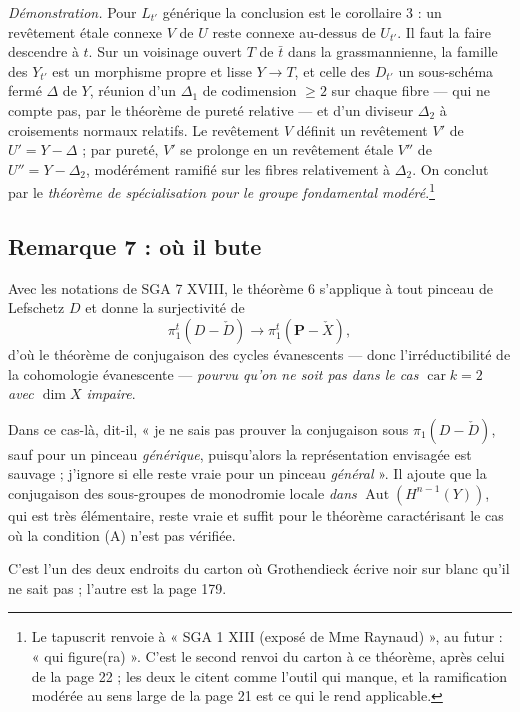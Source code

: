 \documentclass[11pt,a4paper]{article}
\begin{document}
\emph{Démonstration.} Pour $L_{t'}$ générique la conclusion est le corollaire
3 : un revêtement étale connexe $V$ de $U$ reste connexe au-dessus de
$U_{t'}$. Il faut la faire descendre à $t$. Sur un voisinage ouvert $T$ de
$\bar{t}$ dans la grassmannienne, la famille des $Y_{t'}$ est un morphisme
propre et lisse $Y \to T$, et celle des $D_{t'}$ un sous-schéma fermé $\Delta$
de $Y$, réunion d'un $\Delta_{1}$ de codimension $\geqslant 2$ sur chaque
fibre --- qui ne compte pas, par le théorème de pureté relative --- et d'un
diviseur $\Delta_{2}$ à croisements normaux relatifs. Le revêtement $V$
définit un revêtement $V'$ de $U' = Y - \Delta$ ; par pureté, $V'$ se prolonge
en un revêtement étale $V''$ de $U'' = Y - \Delta_{2}$, modérément ramifié sur
les fibres relativement à $\Delta_{2}$. On conclut par le \emph{théorème de
spécialisation pour le groupe fondamental modéré}.\footnote{Le tapuscrit
renvoie à « SGA 1 XIII (exposé de Mme Raynaud) », au futur : « qui
figure(ra) ». C'est le second renvoi du carton à ce théorème, après celui de la
page 22 ; les deux le citent comme l'outil qui manque, et la ramification
modérée au sens large de la page 21 est ce qui le rend applicable.}

\subsection*{Remarque 7 : où il bute}

Avec les notations de SGA 7 XVIII, le théorème 6 s'applique à tout pinceau de
Lefschetz $D$ et donne la surjectivité de
\[
  \pi^{t}_{1}(D - \check{D}) \longrightarrow
  \pi^{t}_{1}(\mathbf{P} - \check{X}) ,
\]
d'où le théorème de conjugaison des cycles évanescents --- donc
l'irréductibilité de la cohomologie évanescente --- \emph{pourvu qu'on ne soit
pas dans le cas $\operatorname{car} k = 2$ avec $\dim X$ impaire}.

Dans ce cas-là, dit-il, « je ne sais pas prouver la conjugaison sous
$\pi_{1}(D - \check{D})$, sauf pour un pinceau \emph{générique}, puisqu'alors
la représentation envisagée est sauvage ; j'ignore si elle reste vraie pour un
pinceau \emph{général} ». Il ajoute que la conjugaison des sous-groupes de
monodromie locale \emph{dans} $\operatorname{Aut}(H^{n-1}(Y))$, qui est très
élémentaire, reste vraie et suffit pour le théorème caractérisant le cas où la
condition (A) n'est pas vérifiée.

C'est l'un des deux endroits du carton où Grothendieck écrive noir sur blanc
qu'il ne sait pas ; l'autre est la page 179.
\end{document}
